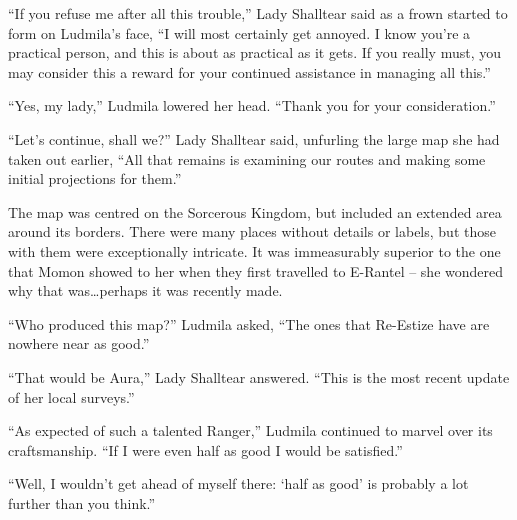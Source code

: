  

“If you refuse me after all this trouble,” Lady Shalltear said as a frown started to form on Ludmila’s face, “I will most certainly get annoyed. I know you’re a practical person, and this is about as practical as it gets. If you really must, you may consider this a reward for your continued assistance in managing all this.”

 

“Yes, my lady,” Ludmila lowered her head. “Thank you for your consideration.”

 

“Let’s continue, shall we?” Lady Shalltear said, unfurling the large map she had taken out earlier, “All that remains is examining our routes and making some initial projections for them.”

 

The map was centred on the Sorcerous Kingdom, but included an extended area around its borders. There were many places without details or labels, but those with them were exceptionally intricate. It was immeasurably superior to the one that Momon showed to her when they first travelled to E-Rantel – she wondered why that was…perhaps it was recently made.

 

“Who produced this map?” Ludmila asked, “The ones that Re-Estize have are nowhere near as good.”

 

“That would be Aura,” Lady Shalltear answered. “This is the most recent update of her local surveys.”

 

“As expected of such a talented Ranger,” Ludmila continued to marvel over its craftsmanship. “If I were even half as good I would be satisfied.”

 

“Well, I wouldn’t get ahead of myself there: ‘half as good’ is probably a lot further than you think.”

